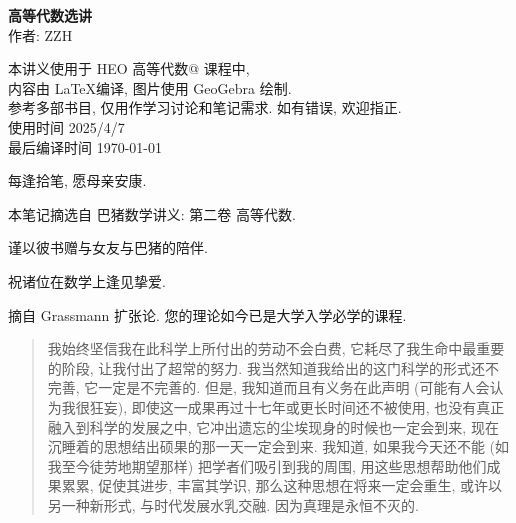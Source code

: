 \documentclass[UTF8]{book}
\makeatletter
\newcommand{\Rmnum}[1]{\expandafter\@slowromancap\romannumeral #1@}
\makeatother
\begin{document}



\begin{titlepage}
    \vspace*{10em}
\begin{center}
    \textbf{\songti 高等代数选讲} \\ %
    \vspace{4em} %
    作者: ZZH \\ %
    \vspace{10em} %

    本讲义使用于 HEO 高等代数\Rmnum{2} 课程中, \\
    内容由 \LaTeX 编译, 图片使用 GeoGebra 绘制. \\
    参考多部书目, 仅用作学习讨论和笔记需求. 如有错误, 欢迎指正. \\
    使用时间 2025/4/7\\

    最后编译时间 \today\\
\end{center}

\end{titlepage} 

\newpage

\vspace*{5em}

每逢拾笔, 愿母亲安康. 

本笔记摘选自 巴猪数学讲义: 第二卷 高等代数. 

谨以彼书赠与女友与巴猪的陪伴. 

祝诸位在数学上逢见挚爱. 

\vspace*{5em}

摘自 Grassmann 扩张论. 您的理论如今已是大学入学必学的课程. 

\begin{quotation}
    \kaishu
    我始终坚信我在此科学上所付出的劳动不会白费, 它耗尽了我生命中最重要的阶段, 
    让我付出了超常的努力. 我当然知道我给出的这门科学的形式还不完善, 
    它一定是不完善的. 但是, 我知道而且有义务在此声明 (可能有人会认为我很狂妄), 
    即使这一成果再过十七年或更长时间还不被使用, 也没有真正融入到科学的发展之中, 
    它冲出遗忘的尘埃现身的时候也一定会到来, 现在沉睡着的思想结出硕果的那一天一定会到来. 
    我知道, 如果我今天还不能 (如我至今徒劳地期望那样) 把学者们吸引到我的周围, 
    用这些思想帮助他们成果累累, 促使其进步, 丰富其学识, 
    那么这种思想在将来一定会重生, 或许以另一种新形式, 与时代发展水乳交融. 
    因为真理是永恒不灭的. 
    \songti
\end{quotation}
\end{document}
